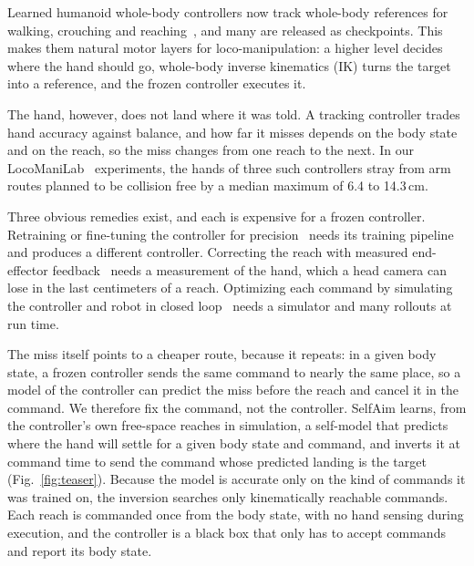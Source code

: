 \documentclass[conference]{IEEEtran}
\begin{document}
Learned humanoid whole-body controllers now track whole-body references for walking, crouching and reaching~\cite{scalebfm,sonic,heft,amo,gr00twbc}, and many are released as checkpoints. This makes them natural motor layers for loco-manipulation: a higher level decides where the hand should go, whole-body inverse kinematics (IK) turns the target into a reference, and the frozen controller executes it.

The hand, however, does not land where it was told. A tracking controller trades hand accuracy against balance, and how far it misses depends on the body state and on the reach, so the miss changes from one reach to the next. In our LocoManiLab~\cite{locomanilab} experiments, the hands of three such controllers stray from arm routes planned to be collision free by a median maximum of 6.4 to 14.3\,cm.

Three obvious remedies exist, and each is expensive for a frozen controller. Retraining or fine-tuning the controller for precision~\cite{humanoidndm} needs its training pipeline and produces a different controller. Correcting the reach with measured end-effector feedback~\cite{hero} needs a measurement of the hand, which a head camera can lose in the last centimeters of a reach. Optimizing each command by simulating the controller and robot in closed loop~\cite{ttco} needs a simulator and many rollouts at run time.

The miss itself points to a cheaper route, because it repeats: in a given body state, a frozen controller sends the same command to nearly the same place, so a model of the controller can predict the miss before the reach and cancel it in the command. We therefore fix the command, not the controller. SelfAim learns, from the controller's own free-space reaches in simulation, a self-model that predicts where the hand will settle for a given body state and command, and inverts it at command time to send the command whose predicted landing is the target (Fig.~\ref{fig:teaser}). Because the model is accurate only on the kind of commands it was trained on, the inversion searches only kinematically reachable commands. Each reach is commanded once from the body state, with no hand sensing during execution, and the controller is a black box that only has to accept commands and report its body state.
\end{document}
